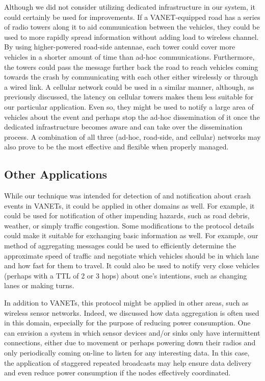 \documentclass{IEEEtran}
\begin{document}
Although we did not consider utilizing dedicated infrastructure in our system, it could certainly be used for improvements.
If a VANET-equipped road has a series of radio towers along it to aid communication between the vehicles, they could be used to more rapidly spread information without adding load to wireless channel.
By using higher-powered road-side antennae, each tower could cover more vehicles in a shorter amount of time than ad-hoc communications.
Furthermore, the towers could pass the message further back the road to reach vehicles coming towards the crash by communicating with each other either wirelessly or through a wired link.
A cellular network could be used in a similar manner, although, as previously discussed, the latency on cellular towers makes them less suitable for our particular application.
Even so, they might be used to notify a large area of vehicles about the event and perhaps stop the ad-hoc dissemination of it once the dedicated infrastructure becomes aware and can take over the dissemination process.
A combination of all three (ad-hoc, road-side, and cellular) networks may also prove to be the most effective and flexible when properly managed.

\subsection{Other Applications}

While our technique was intended for detection of and notification about crash events in VANETs, it could be applied in other domains as well.
For example, it could be used for notification of other impending hazards, such as road debris, weather, or simply traffic congestion.
Some modifications to the protocol details could make it suitable for exchanging basic information as well.
For example, our method of aggregating messages could be used to efficiently determine the approximate speed of traffic and negotiate which vehicles should be in which lane and how fast for them to travel.
It could also be used to notify very close vehicles (perhaps with a TTL of 2 or 3 hops) about one's intentions, such as changing lanes or making turns.

In addition to VANETs, this protocol might be applied in other areas, such as wireless sensor networks.
Indeed, we discussed how data aggregation is often used in this domain, especially for the purpose of reducing power consumption.
One can envision a system in which sensor devices and/or sinks only have intermittent connections, either due to movement or perhaps powering down their radios and only periodically coming on-line to listen for any interesting data.
In this case, the application of staggered repeated broadcasts may help ensure data delivery and even reduce power consumption if the nodes effectively coordinated.
\end{document}
